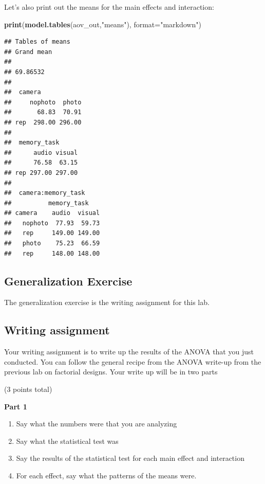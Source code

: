 \documentclass[]{book}
\newenvironment{Shaded}{\begin{snugshade}}{\end{snugshade}}
\newcommand{\KeywordTok}[1]{\textcolor[rgb]{0.13,0.29,0.53}{\textbf{#1}}}
\newcommand{\DataTypeTok}[1]{\textcolor[rgb]{0.13,0.29,0.53}{#1}}
\newcommand{\StringTok}[1]{\textcolor[rgb]{0.31,0.60,0.02}{#1}}
\newcommand{\NormalTok}[1]{#1}
\providecommand{\tightlist}{%
  \setlength{\itemsep}{0pt}\setlength{\parskip}{0pt}}
\begin{document}
Let's also print out the means for the main effects and interaction:

\begin{Shaded}
\begin{Highlighting}[]
\KeywordTok{print}\NormalTok{(}\KeywordTok{model.tables}\NormalTok{(aov_out,}\StringTok{"means"}\NormalTok{), }\DataTypeTok{format=}\StringTok{"markdown"}\NormalTok{)}
\end{Highlighting}
\end{Shaded}

\begin{verbatim}
## Tables of means
## Grand mean
##          
## 69.86532 
## 
##  camera 
##     nophoto  photo
##       68.83  70.91
## rep  298.00 296.00
## 
##  memory_task 
##      audio visual
##      76.58  63.15
## rep 297.00 297.00
## 
##  camera:memory_task 
##          memory_task
## camera    audio  visual
##   nophoto  77.93  59.73
##   rep     149.00 149.00
##   photo    75.23  66.59
##   rep     148.00 148.00
\end{verbatim}

\subsection{Generalization Exercise}\label{generalization-exercise-10}

The generalization exercise is the writing assignment for this lab.

\subsection{Writing assignment}\label{writing-assignment-9}

Your writing assignment is to write up the results of the ANOVA that you
just conducted. You can follow the general recipe from the ANOVA
write-up from the previous lab on factorial designs. Your write up will
be in two parts

(3 points total)

\textbf{Part 1}

\begin{enumerate}
\def\labelenumi{\arabic{enumi}.}
\tightlist
\item
  Say what the numbers were that you are analyzing
\item
  Say what the statistical test was
\item
  Say the results of the statistical test for each main effect and
  interaction
\item
  For each effect, say what the patterns of the means were.
\end{enumerate}
\end{document}
